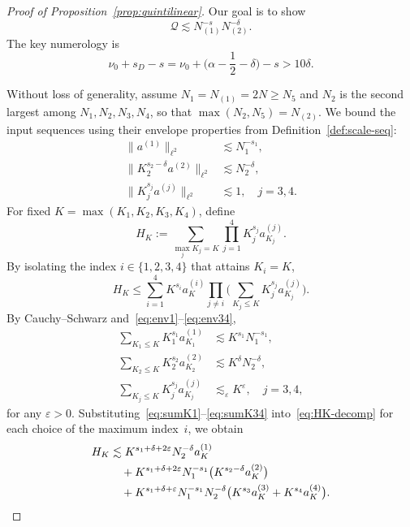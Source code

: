 \documentclass[11pt,reqno,english]{amsart}
\numberwithin{equation}{section}
\theoremstyle{plain}
\theoremstyle{definition}
\theoremstyle{remark}
\renewcommand{\epsilon}{\varepsilon}
\begin{document}
\begin{proof}[Proof of Proposition~\ref{prop:quintilinear}]
Our goal is to show
\begin{equation}\label{eq:target-Q}
	\mathcal{Q}\lesssim N_{(1)}^{-s}N_{(2)}^{-\delta}.
\end{equation}
The key numerology is
\begin{equation}\label{eq:numerology}
	\nu_0 + s_D - s = \nu_0 + \Big(\alpha - \frac{1}{2} - \delta\Big) - s > 10\delta.
\end{equation}

Without loss of generality, assume $N_1 = N_{(1)} = 2N \ge N_5$ and $N_2$ is the second largest among $N_1,N_2,N_3,N_4$, so that $\max(N_2,N_5)=N_{(2)}$. We bound the input sequences using their envelope properties from Definition~\ref{def:scale-seq}:
\begin{align}
	\|a^{(1)}\|_{\ell^2} &\lesssim N_1^{-s_1}, \label{eq:env1} \\
	\|K_2^{s_2-\delta} a^{(2)}\|_{\ell^2} &\lesssim N_2^{-\delta}, \label{eq:env2} \\
	\|K_j^{s_j} a^{(j)}\|_{\ell^2} &\lesssim 1, \quad j=3,4. \label{eq:env34}
\end{align}
For fixed $K=\max(K_1,K_2,K_3,K_4)$, define
\[
H_K := \sum_{\max_j K_j=K} \prod_{j=1}^4 K_j^{s_j} a_{K_j}^{(j)}.
\]
By isolating the index $i \in \{1,2,3,4\}$ that attains $K_i = K$,
\begin{equation}\label{eq:HK-decomp}
	H_K \le \sum_{i=1}^4 K^{s_i} a_K^{(i)} \prod_{j \neq i} \Big(\sum_{K_j \le K} K_j^{s_j} a_{K_j}^{(j)}\Big).
\end{equation}
By Cauchy--Schwarz and~\eqref{eq:env1}--\eqref{eq:env34},
\begin{align}
	\sum_{K_1 \le K} K_1^{s_1} a_{K_1}^{(1)} &\lesssim K^{s_1} N_1^{-s_1}, \label{eq:sumK1} \\
	\sum_{K_2 \le K} K_2^{s_2} a_{K_2}^{(2)} &\lesssim K^{\delta} N_2^{-\delta}, \label{eq:sumK2} \\
	\sum_{K_j \le K} K_j^{s_j} a_{K_j}^{(j)} &\lesssim_{\epsilon} K^{\epsilon},\quad j=3,4, \label{eq:sumK34}
\end{align}
for any $\epsilon > 0$. Substituting~\eqref{eq:sumK1}--\eqref{eq:sumK34} into~\eqref{eq:HK-decomp} for each choice of the maximum index~$i$, we obtain
\begin{align}
	H_K &\lesssim K^{s_1+\delta+2\epsilon} N_2^{-\delta} a_K^{(1)} \notag \\
	&\quad + K^{s_1+\delta+2\epsilon} N_1^{-s_1} \big(K^{s_2-\delta} a_K^{(2)}\big) \notag \\
	&\quad + K^{s_1+\delta+\epsilon} N_1^{-s_1} N_2^{-\delta} \big(K^{s_3} a_K^{(3)} + K^{s_4} a_K^{(4)}\big). \label{eq:HK-bound}

\end{align}
\end{proof}
\end{document}
